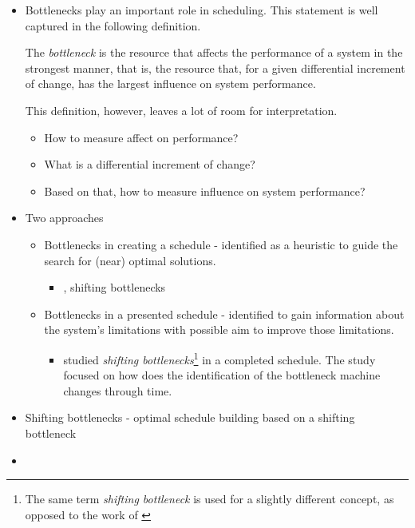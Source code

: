 \begin{itemize}
    \item Bottlenecks play an important role in scheduling. This statement is well captured
        in the following definition.
    \begin{defn*}
        The \emph{bottleneck} is the resource that affects the performance of a system in the strongest
        manner, that is, the resource that, for a given differential increment of change, has
        the largest influence on system performance.
    \end{defn*}
        This definition, however, leaves a lot of room for interpretation.
        \begin{itemize}
            \item How to measure affect on performance?
            \item What is a differential increment of change?
            \item Based on that, how to measure influence on system performance?
        \end{itemize}
    
    \item Two approaches
    \begin{itemize}
        \item Bottlenecks in creating a schedule - identified as a heuristic to guide the search
            for (near) optimal solutions.
        \begin{itemize}
            \item \citet{ADAMS1988}, shifting bottlenecks
        \end{itemize}

        \item Bottlenecks in a presented schedule - identified to gain information about the system's
            limitations with possible aim to improve those limitations.
        \begin{itemize}
            \item \citet{LAWRENCE1994} studied \emph{shifting bottlenecks}\footnote{The same term
                \emph{shifting bottleneck} is used for a slightly different concept, as opposed to the work
                of \citet{ADAMS1988}} in a completed schedule. The study focused on how does
                the identification of the bottleneck machine changes through time.

        \end{itemize}
        
    \end{itemize}

    \item Shifting bottlenecks - optimal schedule building based on a shifting bottleneck
    \item 
\end{itemize}

